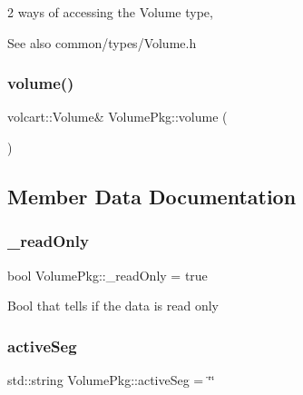 2 ways of accessing the Volume type, \begin{DoxySeeAlso}{See also}
common/types/\+Volume.\+h 
\end{DoxySeeAlso}
\hypertarget{classVolumePkg_a49a10fff903e76fe8fbd72793621eaa2}{}\label{classVolumePkg_a49a10fff903e76fe8fbd72793621eaa2} 
\subsubsection{\texorpdfstring{volume()}{volume()}\hspace{0.1cm}{\footnotesize\ttfamily [2/2]}}
{\footnotesize\ttfamily volcart\+::\+Volume\& Volume\+Pkg\+::volume (\begin{DoxyParamCaption}{ }\end{DoxyParamCaption})\hspace{0.3cm}{\ttfamily [inline]}}



\subsection{Member Data Documentation}
\hypertarget{classVolumePkg_a032ffe2acb8dcb5efe26312a3730aa85}{}\label{classVolumePkg_a032ffe2acb8dcb5efe26312a3730aa85} 
\subsubsection{\texorpdfstring{\+\_\+read\+Only}{\_readOnly}}
{\footnotesize\ttfamily bool Volume\+Pkg\+::\+\_\+read\+Only = true\hspace{0.3cm}{\ttfamily [private]}}

Bool that tells if the data is read only \hypertarget{classVolumePkg_a192921e57935c16e2e92c2ede350e08a}{}\label{classVolumePkg_a192921e57935c16e2e92c2ede350e08a} 
\subsubsection{\texorpdfstring{active\+Seg}{activeSeg}}
{\footnotesize\ttfamily std\+::string Volume\+Pkg\+::active\+Seg = \char`\"{}\char`\"{}\hspace{0.3cm}{\ttfamily [private]}}

